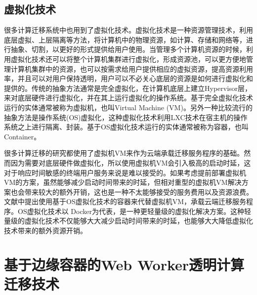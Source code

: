 \subsection{虚拟化技术}

很多计算迁移系统中也用到了虚拟化技术。虚拟化技术是一种资源管理技术，利用底层虚拟、上层隔离等方法，将计算机中的物理资源，如计算、存储和网络等，进行抽象、切割，以更好的形式提供给用户使用\cite{goth2007virtualization}。当管理多个计算机资源的时候，利用虚拟化技术还可以将整个计算机集群进行虚拟化，形成资源池，可以更方便地管理计算机集群中的资源，也可以按需求给用户提供相应的虚拟资源，提高资源利用率，并且可以对用户保持透明，用户可以不必关心底层的资源是如何进行虚拟化和提供的。传统的抽象方法通常是完全虚拟化，在计算机底层上建立Hypervisor层，来对底层硬件进行虚拟化，并在其上运行虚拟化的操作系统。基于完全虚拟化技术运行的实体通常被称为虚拟机，也叫Virtual Machine (VM)。另外一种比较流行的抽象方法是操作系统(OS)虚拟化，这种虚拟化技术利用LXC技术在宿主机的操作系统之上进行隔离、封装。基于OS虚拟化技术运行的实体通常被称为容器，也叫Container。

很多计算迁移的研究\cite{chae2014cmcloud,chun2011clonecloud,kosta2012thinkair,shi2014cosmos}都使用了虚拟机VM来作为云端承载迁移服务程序的基础。然而因为需要对底层硬件做虚拟化，所以使用虚拟机VM会引入极高的启动时延，这对于响应时间敏感的终端用户服务来说是难以接受的。如果考虑提前部署虚拟机VM的方案，虽然能够减少启动时间带来的时延，但相对重型的虚拟机VM解决方案也会带来较大的额外开销，这也是一种不太能够接受的服务费用以及资源浪费\cite{ismail2015evaluation}。文献\cite{wu2017container}中提出使用基于OS虚拟化技术的容器来代替虚拟机VM，承载云端迁移服务程序。OS虚拟化技术以 Docker为代表，是一种更轻量级的虚拟化解决方案\cite{陈霄2017基于}。这种轻量级的虚拟化技术不仅能够大大减少启动时间带来的时延，也能够大大降低虚拟化技术带来的额外资源开销。

\section{基于边缘容器的Web Worker透明计算迁移技术}\label{sec:computation_offloading_system_design}

